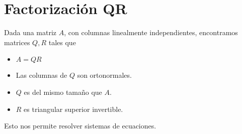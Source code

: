 \documentclass{./Geometria.tex}
\begin{document}
\section{Factorización QR}
Dada una matriz \(A\), con columnas linealmente independientes, encontramos matrices
\(Q,R\) tales que
\begin{itemize}
    \item \(A=QR\)
    \item Las columnas de \(Q\) son ortonormales.
    \item \(Q\) es del mismo tamaño que \(A\).
    \item \(R\) es triangular superior invertible.
\end{itemize}
Esto nos permite resolver sistemas de ecuaciones.
\end{document}
